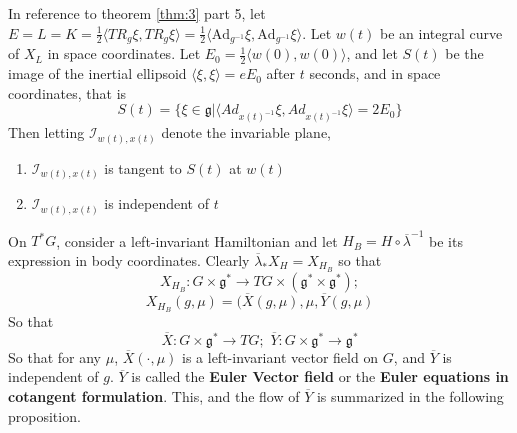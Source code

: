\begin{thm}

In reference to theorem \ref{thm:3} part 5, let $E=L=K=\frac{1}{2}\langle TR_g \xi, TR_g \xi \rangle = \frac{1}{2}\langle \mathrm{Ad}_{g^{-1}} \xi, \mathrm{Ad}_{g^{-1}} \xi \rangle$. Let $w(t)$ be an integral curve of $X_L$ in space coordinates. Let $E_0 = \frac{1}{2}\langle w(0), w(0) \rangle$, and let $S(t)$ be the image of the inertial ellipsoid $\langle \xi, \xi \rangle = e E_0$ after $t$ seconds, and in space coordinates, that is 
\begin{equation}S(t) = \{ \xi \in \mathfrak{g} \vert \langle Ad_{x(t)^{-1}} \xi, Ad_{x(t)^{-1}} \xi \rangle = 2 E_0 \}\end{equation}
Then letting $\mathcal{I}_{w(t), x(t)}$ denote the invariable plane,
\begin{enumerate}
    \item $\mathcal{I}_{w(t),x(t)}$ is tangent to $S(t)$ at $w(t)$
    \item $\mathcal{I}_{w(t),x(t)}$ is independent of $t$
\end{enumerate}
\end{thm}

On $T^*G$, consider a left-invariant Hamiltonian and let $H_B = H \circ \overline{\lambda}^{-1}$ be its expression in body coordinates. Clearly $\overline{\lambda}_* X_H = X_{H_B}$ so that 
\begin{equation}X_{H_B}: G \times \mathfrak{g}^* \to TG \times (\mathfrak{g}^* \times \mathfrak{g}^*); \end{equation}
\begin{equation}X_{H_B}(g, \mu) = (\overline{X}(g,\mu), \mu, \overline{Y}(g,\mu)\end{equation}
So that
\begin{equation}\overline{X}:G \times \mathfrak{g}^* \to TG; \hspace{4pt} \overline{Y}: G \times \mathfrak{g}^* \to \mathfrak{g}^*\end{equation}
So that for any $\mu$, $\overline{X}(\cdot, \mu)$ is a left-invariant vector field on $G$, and $\overline{Y}$ is independent of $g$. $\overline{Y}$ is called the \textbf{Euler Vector field} or the \textbf{Euler equations in cotangent formulation}. This, and the flow of $\overline{Y}$ is summarized in the following proposition.

